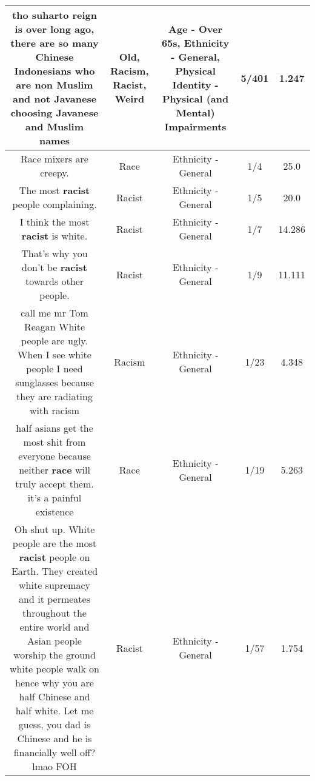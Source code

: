 \documentclass[11pt]{article}
\newlength\mylength
\begin{document}
\begin{center}
\begin{longtable}{|C{.65\mylength}|C{.30\mylength}|C{.12\mylength}|C{.12\mylength}|C{.12\mylength}|}
tho suharto reign is over long ago, there are so many Chinese Indonesians who are non Muslim and not Javanese choosing Javanese and Muslim names\normalsize   & Old, Racism, Racist, Weird & Age - Over 65s, Ethnicity - General, Physical Identity - Physical (and Mental) Impairments & 5/401 & 1.247 \\  \hline
  \small Race mixers are creepy.\normalsize   & Race & Ethnicity - General & 1/4 & 25.0 \\  \hline
  \small The most \textbf{racist} people complaining.\normalsize   & Racist & Ethnicity - General & 1/5 & 20.0 \\  \hline
  \small I think the most \textbf{racist} is white.\normalsize   & Racist & Ethnicity - General & 1/7 & 14.286 \\  \hline
  \small That's why you don't be \textbf{racist} towards other people.\normalsize   & Racist & Ethnicity - General & 1/9 & 11.111 \\  \hline
  \small call me mr Tom Reagan White people are ugly. When I see white people I need sunglasses because they are radiating with racism\normalsize   & Racism & Ethnicity - General & 1/23 & 4.348 \\  \hline
  \small half asians get the most shit from everyone because neither \textbf{race} will truly accept them. it's a painful existence\normalsize   & Race & Ethnicity - General & 1/19 & 5.263 \\  \hline
  \small Oh shut up. White people are the most \textbf{racist} people on Earth. They created white supremacy and it permeates throughout the entire world and Asian people worship the ground white people walk on hence why you are half Chinese and half white. Let me guess, you dad is Chinese and he is financially well off? lmao FOH\normalsize   & Racist & Ethnicity - General & 1/57 & 1.754 \\  \hline

\end{longtable}
\end{center}
\end{document}
